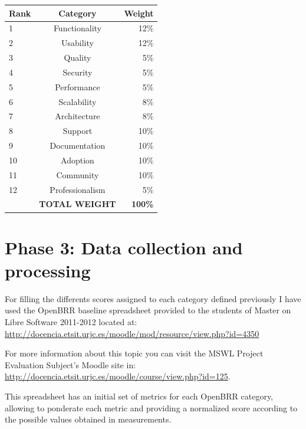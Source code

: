 \documentclass[a4paper,12pt]{book}
\begin{document}
\begin{table}[ht]
\begin{center}
    \begin{tabular}{ | l | c | r |}
    \hline
    \textbf{Rank} & \textbf{Category} & \textbf{Weight} \\ \hline
    1 & Functionality & 12\% \\ \hline
    2 & Usability & 12\% \\ \hline
    3 & Quality & 5\% \\ \hline
    4 & Security & 5\% \\ \hline
    5 & Performance & 5\% \\ \hline
    6 & Scalability & 8\% \\ \hline
    7 & Architecture & 8\% \\ \hline
    8 & Support & 10\% \\ \hline
    9 & Documentation & 10\% \\ \hline
    10 & Adoption & 10\% \\ \hline
    11 & Community & 10\% \\ \hline
    12 & Professionalism & 5\% \\ \hline
     & \textbf{TOTAL WEIGHT} & \textbf{100\%} \\ \hline  
    \end{tabular}
\end{center}
\label{OpenBRR2}
\end{table}

\section{Phase 3: Data collection and processing}
\label{sec:phase3}
For filling the differents scores assigned to each category defined previously I have used the OpenBRR baseline spreadsheet provided to the students of Master on Libre Software 2011-2012 located at:\\
\url{http://docencia.etsit.urjc.es/moodle/mod/resource/view.php?id=4350}

For more information about this topic you can visit the MSWL Project Evaluation Subject's Moodle site in:\\
\url{http://docencia.etsit.urjc.es/moodle/course/view.php?id=125}. 

This spreadsheet has an initial set of metrics for each OpenBRR category, allowing to ponderate each metric and providing a normalized score according to the possible values obtained in measurements.
\end{document}

